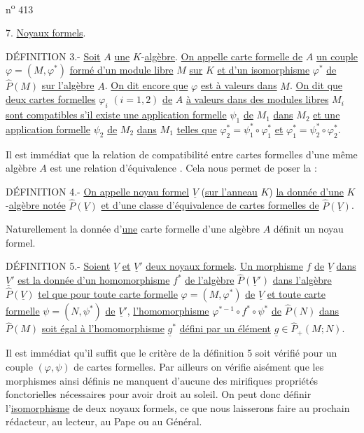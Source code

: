 \hfill n\textsuperscript{o} 413

7. \uline{Noyaux formels}.

DÉFINITION 3.- \uline{Soit} $A$ \uline{une} $K$-\uline{algèbre}. \uline{On appelle carte formelle de} $A$ \uline{un couple} $\varphi=(M,\varphi^*)$ \uline{formé d'un module libre} $M$ \uline{sur} $K$ \uline{et d'un isomorphisme} $\varphi^*$ \uline{de} $\widehat P(M)$ \uline{sur l'algèbre} $A$. \uline{On dit encore que} $\varphi$ \uline{est à valeurs dans} $M$. \uline{On dit que deux cartes formelles} $\varphi_i$ $(i=1,2)$ \uline{de} $A$ \uline{à valeurs dans des modules libres} $M_i$ \uline{sont compatibles s'il existe une application formelle} $\psi_1$ \uline{de} $M_1$ \uline{dans} $M_2$ \uline{et une application formelle} $\psi_2$ \uline{de} $M_2$ \uline{dans} $M_1$ \uline{telles que} $\varphi_2^*=\psi_1^*\circ\varphi_1^*$ \uline{et} $\varphi_1^*=\psi_2^*\circ\varphi_2^*$.

Il est immédiat que la relation de compatibilité entre cartes formelles d'une même algèbre $A$ est une relation d'équivalence . Cela nous permet de poser la :

DÉFINITION 4.- \uline{On appelle noyau formel} $\underline V$ (\uline{sur l'anneau} $K$) \uline{la donnée d'une} $K$-\uline{algèbre notée} $\widehat P(\underline V)$ \uline{et d'une classe d'équivalence de cartes formelles de} $\widehat P(\underline V)$.

Naturellement la donnée d'\uline{une} carte formelle d'une algèbre $A$ définit un noyau formel.

DÉFINITION 5.- \uline{Soient} $\underline V$ \uline{et} $\underline V'$ \uline{deux noyaux formels}. \uline{Un morphisme} $f$ \uline{de} $\underline V$ \uline{dans} $\underline V'$ \uline{est la donnée d'un homomorphisme} $f^*$ \uline{de l'algèbre} $\widehat P(\underline V')$ \uline{dans l'algèbre} $\widehat P(\underline V)$ \uline{tel que pour toute carte formelle} $\varphi=(M,\varphi^*)$ \uline{de} $\underline V$ \uline{et toute carte formelle} $\psi=(N,\psi^*)$ \uline{de} $\underline V'$, \uline{l'homomorphisme} $\varphi^{*-1}\circ f^*\circ\psi^*$ \uline{de} $\widehat P(N)$ \uline{dans} $\widehat P(M)$ \uline{soit égal à l'homomorphisme} $\underline g^*$ \uline{défini par un élément} $\underline g\in\widehat P_+(M;N)$.

Il est immédiat qu'il suffit que le critère de la définition 5 soit vérifié pour un couple $(\varphi,\psi)$ de cartes formelles. Par ailleurs on vérifie aisément que les morphismes ainsi définis ne manquent d'aucune des mirifiques propriétés fonctorielles nécessaires pour avoir droit au soleil. On peut donc définir l'\uline{isomorphisme} de deux noyaux formels, ce que nous laisserons faire au prochain rédacteur, au lecteur, au Pape ou au Général.

